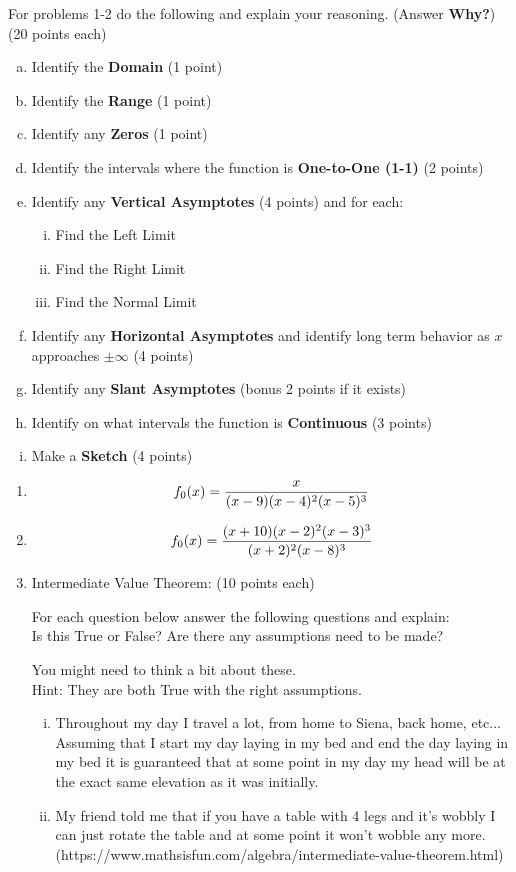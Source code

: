 \documentclass[11pt]{article}
\begin{document}
	For problems 1-2 do the following and explain your reasoning.  (Answer {\bf Why?}) (20 points each)
	\begin{enumerate}[a)]
		\item  Identify the {\bf Domain} (1 point)
		\item  Identify the {\bf Range} (1 point)
		\item  Identify any {\bf Zeros} (1 point)
		\item  Identify the intervals where the function is {\bf One-to-One (1-1)} (2 points)
		\item  Identify any {\bf Vertical Asymptotes} (4 points) and for each:
		\begin{enumerate}[i)]
			\item  Find the Left Limit
			\item  Find the Right Limit
			\item  Find the Normal Limit
		\end{enumerate}
		\item  Identify any {\bf Horizontal Asymptotes}  and identify long term behavior as $x$ approaches $\pm \infty$ (4 points)
		\item  Identify any {\bf Slant Asymptotes} (bonus 2 points if it exists)
		\item  Identify on what intervals the function is {\bf Continuous} (3 points)
		\item  Make a {\bf Sketch} (4 points)
	\end{enumerate}
	\newpage
	\begin{enumerate}
		\item  $$f_{\number\value{enumi}}(x) = \frac{x}{(x-9)(x-4)^2(x-5)^3}$$
		\newpage
		\item  $$f_{\number\value{enumi}}(x) = \frac{(x+10)(x-2)^2(x-3)^3}{(x+2)^2(x-8)^3}$$
		\newpage
		\item Intermediate Value Theorem: (10 points each)\par
		For each question below answer the following questions and explain:\\
		Is this True or False?  Are there any assumptions need to be made?\par
		You might need to think a bit about these.\\
		Hint: They are both True with the right assumptions.
		\begin{enumerate}[i)]
			\item  Throughout my day I travel a lot, from home to Siena, back home, etc...  Assuming that I start my day laying in my bed and end the day laying in my bed it is guaranteed that at some point in my day my head will be at the exact same elevation as it was initially.
			\vspace{2.5in}
			\item  My friend told me that if you have a table with 4 legs and it's wobbly I can just rotate the table and at some point it won't wobble any more.\\
			(https://www.mathsisfun.com/algebra/intermediate-value-theorem.html)
		\end{enumerate}
	\end{enumerate}
	
\end{document}
